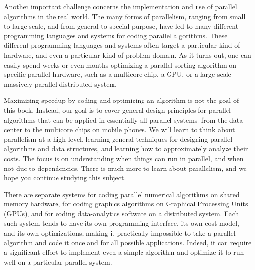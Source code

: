 \begin{gram}
\label{gr:intro::intro::parallelism::challenges-software}
Another important challenge concerns the implementation and use of
parallel algorithms in the real world.
%
The many forms of parallelism, ranging from small to large scale, and
from general to special purpose, have led to many different programming
languages and systems for coding parallel algorithms.
%
These different programming languages and systems often target a
particular kind of hardware, and even a particular kind of problem
domain.  
%
As it turns out, one can easily spend weeks or even months optimizing a
parallel sorting algorithm on specific parallel hardware, such as a
multicore chip, a GPU, or a large-scale massively parallel distributed
system.
\end{gram}


\begin{gram}
Maximizing speedup by coding and optimizing an algorithm is not the
goal of this book.
%
Instead, our goal is to cover general design principles for parallel
algorithms that can be applied in essentially all parallel systems,
from the data center to the multicore chips on mobile phones.
%
We will learn to think about parallelism at a high-level, learning
general techniques for designing parallel algorithms and data
structures, and learning how to approximately analyze their costs.
%
The focus is on understanding when things can run in parallel, and
when not due to dependencies.  
%
There is much more to learn about parallelism, and we hope you
continue studying this subject.
\end{gram}

\begin{example}
There are separate systems for coding parallel numerical
algorithms on shared memory hardware, for coding graphics algorithms
on Graphical Processing Units (GPUs), and for coding data-analytics
software on a distributed system.
%
Each such system tends to have its own programming interface, its own
cost model, and its own optimizations, making it practically
impossible to take a parallel algorithm and code it once and for all 
possible applications.
%
Indeed, it can require a significant effort to implement even a simple
algorithm and optimize it to run well on a particular parallel system. 
\end{example}

